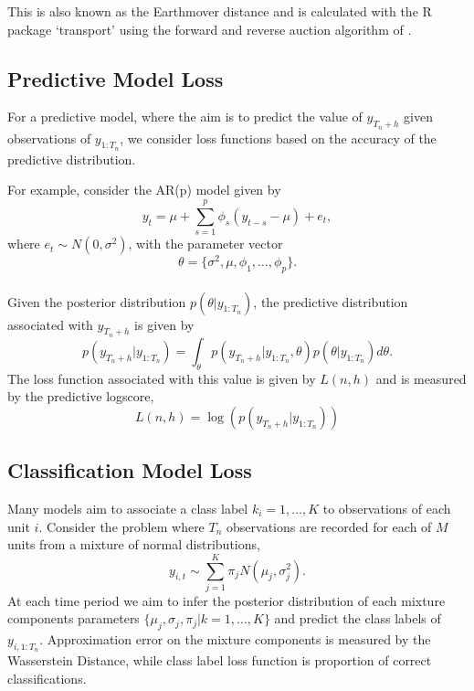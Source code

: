 \documentclass[12pt,a4paper]{article}\usepackage[]{graphicx}\usepackage[]{color}
\begin{document}
This is also known as the Earthmover distance and is calculated with the R package `transport' \citep{transport} using the forward and reverse auction algorithm of \citet{Bertsekas1992}.

\subsection{Predictive Model Loss}

For a predictive model, where the aim is to predict the value of $y_{T_n + h}$ given observations of $y_{1:T_n}$, we consider loss functions based on the accuracy of the predictive distribution.

For example, consider the AR(p) model given by
\begin{equation}
y_t = \mu + \sum_{s=1}^p \phi_s (y_{t-s} - \mu) + e_t,
\end{equation}
where $e_t \sim N(0, \sigma^2)$, with the parameter vector
\begin{equation}
\theta = \{\sigma^2, \mu, \phi_1, \dots, \phi_p \}.
\end{equation}
\\

Given the posterior distribution $p(\theta | y_{1:T_n})$, the predictive distribution associated with $y_{T_n +h}$ is given by
\begin{equation}
\label{forecastDistIntro}
p(y_{T_n + h} | y_{1:T_n}) = \int_{\theta} p(y_{T_n + h} | y_{1:T_n}, \theta)p(\theta | y_{1:T_n})d\theta.
\end{equation}
The loss function associated with this value is given by $L(n, h)$ and is measured by the predictive logscore,
\begin{equation}
\label{loss:logscoreIntro}
L(n, h) = \log(p(y_{T_n + h} | y_{1:T_n}))
\end{equation}

\subsection{Classification Model Loss}

Many models aim to associate a class label $k_i = 1 , \dots, K$ to observations of each unit $i$. Consider the problem where $T_n$ observations are recorded for each of $M$ units from a mixture of normal distributions,
\begin{equation}
\label{mixNormalDGP}
y_{i, t} \sim \sum_{j=1}^K \pi_{j} N(\mu_j, \sigma^2_{j}).
\end{equation}
At each time period we aim to infer the posterior distribution of each mixture components parameters $\{\mu_j, \sigma_j, \pi_j | k = 1, \dots, K\}$ and predict the class labels of $y_{i, 1:T_n}$. Approximation error on the mixture components is measured by the Wasserstein Distance, while class label loss function is proportion of correct classifications.
\end{document}
